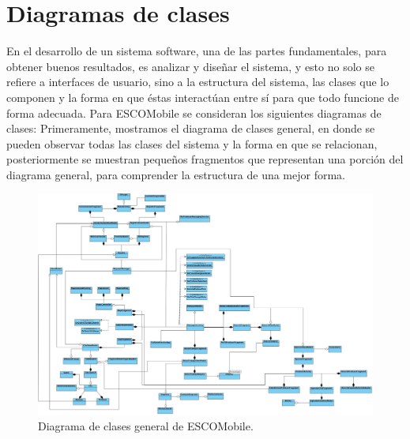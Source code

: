\section{Diagramas de clases}

\noindent
En el desarrollo de un sistema software, una de las partes fundamentales, para obtener buenos resultados, es analizar y diseñar el sistema, y esto no solo se refiere a interfaces de usuario, sino a la estructura del sistema, las clases que lo componen y la forma en que éstas interactúan entre sí para que todo funcione de forma adecuada.
\newline
Para ESCOMobile se consideran los siguientes diagramas de clases:
\newline
\newline
\noindent
Primeramente, mostramos el diagrama de clases general, en donde se pueden observar todas las clases del sistema y la forma en que se relacionan, posteriormente se muestran pequeños fragmentos que representan una porción del diagrama general, para comprender la estructura de una mejor forma.

\pagebreak
\begin{figure}[!htpb]
	\hypertarget{fig:clasesGeneral}{\hspace{1pt}}
	\begin{center}
		\includegraphics[width=1\textwidth]{images/clases/DiagramaClasesGeneralESCOMobileApp}
		\caption{Diagrama de clases general de ESCOMobile.}
		\label{fig:clasesGeneral}
	\end{center}
\end{figure}

